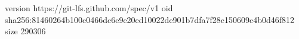 version https://git-lfs.github.com/spec/v1
oid sha256:81460264b100c0466dc6e9e20ed10022de901b7dfa7f28c150609c4b0d46f812
size 290306
